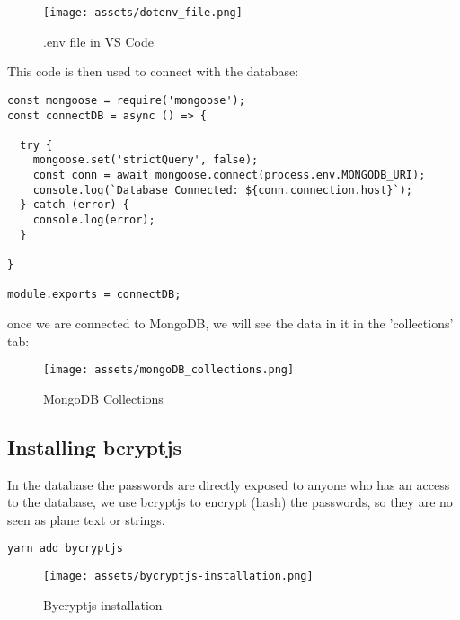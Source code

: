\documentclass[12pt]{article}
\begin{document}
\begin{figure}[H]
    \centering
    \texttt{[image: assets/dotenv\_file.png]}
    \caption{.env file in VS Code}
    \label{fig:logo}
\end{figure}

This code is then used to connect with the database:

\begin{listing}[htbp]
\begin{verbatim}
const mongoose = require('mongoose');
const connectDB = async () => {
  
  try {
    mongoose.set('strictQuery', false);
    const conn = await mongoose.connect(process.env.MONGODB_URI);
    console.log(`Database Connected: ${conn.connection.host}`);
  } catch (error) {
    console.log(error);
  }

}

module.exports = connectDB;

\end{verbatim}
\end{listing}


once we are connected to MongoDB, we will see the data in it in the 'collections' tab:

\begin{figure}[H]
    \centering
    \texttt{[image: assets/mongoDB\_collections.png]}
    \caption{MongoDB Collections}
    \label{fig:logo}
\end{figure}


\subsection{Installing bcryptjs}

In the database the passwords are directly exposed to anyone who has an access to the database, we use bcryptjs to encrypt (hash) the passwords, so they are no seen as plane text or strings.

\begin{listing}[htbp]
\begin{verbatim}
yarn add bycryptjs
\end{verbatim}
\end{listing}


\begin{figure}[H]
    \centering
    \texttt{[image: assets/bycryptjs-installation.png]}
    \caption{Bycryptjs installation}
    \label{fig:logo}
\end{figure}
\end{document}
